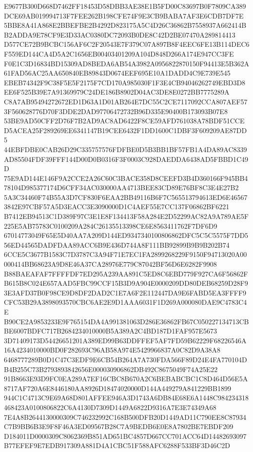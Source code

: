 \documentclass[UTF8,fontset=fandol,zihao=-4,a4paper]{ctexart}
\begin{document}
{{E9677B300D668D7462FF18453D58DBB3AE38E1B5FD00C83697B0F7809CA389DCE69AB019994713F7FEE262B198CFE74F9E3CB9BABA7AF3E6CDB7DF7E
5BBE8A41A868E2BBEFBE2B4292D823175A5C4D26C36862B7558937A662414BB2ADDA9E78CF9E3D33AC0380DC72093B0DE8C42D2BE07470A289814413
D577CE72B9BCBC156AF6C2F20543E7F379C07A897B8F4EEC6FE13B114DEC6F559ED144CA4D5A2C1656EB00403401209A104D848D266A174E947CC3FE
F0E1C3D16834BD15309AD8BEDA6AB54A3982A0956822870150F94413E5B362A61FAD56AC25AA650840EB89843D0674EEF695E10A1DADD4C9E739E545
EBEB74342F9C38F5E5F2175F7CD170A985030F1F3E4CB94046262749EBD3D8EE6F525B39E7A91369979C24DE186B8902D04AC3DE8E0272BB7775289A
C8A7AB95494272672ED1D63A1D01AB264E7DC55C2CE7117092CCA807AEF573F560628776D70F3DDE2DAD97706472732B96D335E90400B173093B07E8
53BE9AD50CFF2D76F7B2AD9AC8AD6422F8CE59AFD761038A78BDF51CCED5ACEA25F289269EE6341147B19CEE6432F1DD1600C1DBF3F609209AE87DD5
44EBFDBE0CAB26D29C335757576FDFBE0D5B3BB1BF57FB1A4DA89AC8339AD85504FDF39FFF144D00D0B0316F3F0003C928DAEDDA6438AD5FBBD1C49D
75E9AD144E146F9A2CCE2A26C60C3BACE358D8CEEFD3B4D360166F945BB478104D985377174D6CFF34AC030000AA4713BEE83CD89E76BF8C3E4E27B2
5A3C34460F74B55A3D7CF830F6EAA2BB49116B6F7C565513794613ED6E465673842E97CBF57A5D3EACC3E3090000D1C4AEF55E7CC137F06862BF6221
B7412EB94513C1D389F97C3E1E8F134413F58A284E2D52299AC82A9A789AE5F225E5AB75783C0100209A284C26135513398CE6E8563411762F7DF6D9
67014773049F65E5D40AA7A209D144ED9347340100806862DFC5C5C5575F7DD556ED44565DADFDAA89ACC6B9E436D744A8F111BB92899B9B9B202B74
6CCE5C3677B1583C7D3787C3A94F71E7EC1FA2899268229F9150F94713020A00000414BB68623A9D8E46A37CA28976E779C87042BF56D6E6282F9908
B88BAEAFAF7FFFFDF7ED295A239AA891C5ED8C6EBD779F927CA6F56862FB615B8C024E657AAD5FBC99CCF15B3D9A904E0000209DD80DEB68259D28F9
3E3AFD37B0F98CE9D8DF2DAD2C1E7A6F2E112447DA9E6FABD5EA3FFFF9CFC53B29A3898093570CBC6AE2E9D1AAA6031F1D269A000080DAE9C4783C4E
B90CE2A9853233E9F765154DA4A991381063D286E36862FB67C050227134713CBBE6007BDFC717B2684234010000B5A389A2C4BD187D1FAF957E5673
3D71409173D54426651201A389ED99B63DDFFEF5AF7FD59B62229F68226546A16A4234010000BD0F282693C96AB58A974E5429966837A0C82D9A38A8
6468777289B0D1C47C3EDF9E6CB54B264A7A730FDA566F89D24E4FA770104DB4B255C73B2793893842656E000030906862DB492C8675049F74A25E22
91B8663E93D9FC0EA289A7EF16CBC8B670A2C6BEBABCBC1C8D464D56E5A8717AF720A6E8446180AA8926D18474020000D144A449279A841229BB1899
944C1C4713C9E69A68D801AFFEE946A3D1743A6DB84E68E6A1448C984234318468423A0100806822C6A4130D7309D1449A6822D9316A7E3E74349A68
7E4A8B2644130000309C746232992C168B500DFB20D1449AD11C790EE8C87934C7B9BB6B3E9F8F46A3ED09567B28C7A9BEDB6E0E8A7802BE7EBDF209
D184011D0000309C8062369B851AD651BC4857D667CC701ACC64D14482693097B77EFEF9E7EDB917309A881D4A1CBC51F588AFC6288F533BF3D46C2D
}}
\end{document}
